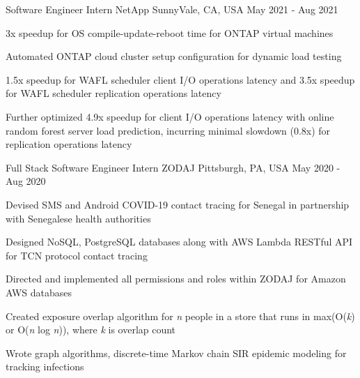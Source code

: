 

\begin{cventries}

  \cventry
    {Software Engineer Intern} %
    {NetApp} %
    {SunnyVale, CA, USA} %
    {May 2021 - Aug 2021} %
    {
      \begin{cvitems} %
        \item {3x speedup for OS compile-update-reboot time for ONTAP virtual machines}
        \item {Automated ONTAP cloud cluster setup configuration for dynamic load testing}
        \item {1.5x speedup for WAFL scheduler client I/O operations latency and 3.5x speedup for WAFL scheduler replication operations latency}
        \item {Further optimized 4.9x speedup for client I/O operations latency with online random forest server load prediction, incurring minimal slowdown (0.8x) for replication operations latency}
      \end{cvitems}
    }

  \cventry
    {Full Stack Software Engineer Intern} %
    {ZODAJ} %
    {Pittsburgh, PA, USA} %
    {May 2020 - Aug 2020} %
    {
      \begin{cvitems} %
        \item {Devised SMS and Android COVID-19 contact tracing for Senegal in partnership with Senegalese health authorities}
        \item {Designed NoSQL, PostgreSQL databases along with AWS Lambda RESTful API for TCN protocol contact tracing}
        \item {Directed and implemented all permissions and roles within ZODAJ for Amazon AWS databases}
        \item {Created exposure overlap algorithm for \textit{n} people in a store that runs in max(O(\textit{k}) or O(\textit{n} log \textit{n})), where \textit{k} is overlap count}
        \item {Wrote graph algorithms, discrete-time Markov chain SIR epidemic modeling for tracking infections}
      \end{cvitems}
    }


\end{cventries}
